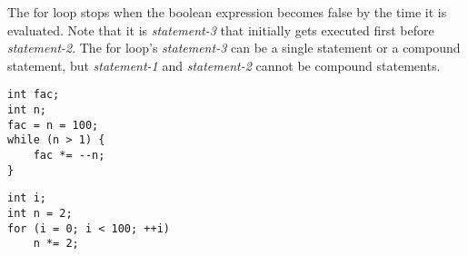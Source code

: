 \documentclass[a4paper,12pt]{article}
\begin{document}
The for loop stops when the boolean expression becomes false by the time it is evaluated. Note that it is \textit{statement-3} that initially gets executed first before \textit{statement-2}. The for loop's \textit{statement-3} can be a single statement or a compound statement, but \textit{statement-1} and \textit{statement-2} cannot be compound statements.

\begin{lstlisting}[caption=Example of calculating factorial of 100 using a while loop]
int fac;
int n;
fac = n = 100;
while (n > 1) {
	fac *= --n;
}
\end{lstlisting}

\begin{lstlisting}[caption=Example of calculating 2 raised to the 100th power using a for loop]
int i;
int n = 2;
for (i = 0; i < 100; ++i)
	n *= 2;
\end{lstlisting}
\end{document}
